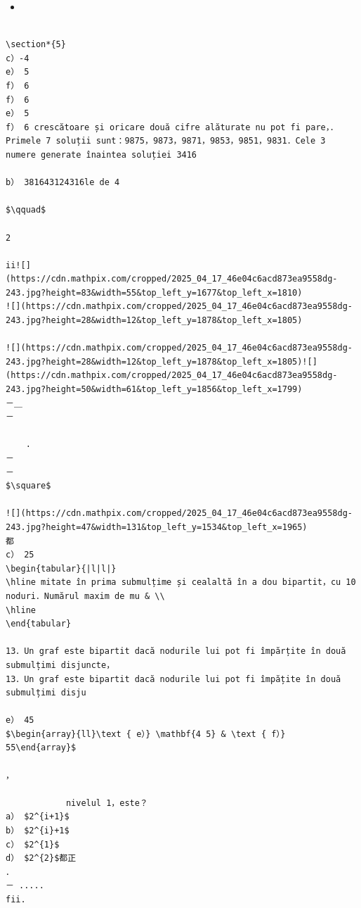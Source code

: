 \documentclass[10pt]{article}
\begin{document}
\begin{itemize}
  \item 
\end{itemize}

\begin{verbatim}

\section*{5}
c）-4
e） 5
f） 6
f） 6
e） 5
f） 6 crescătoare și oricare două cifre alăturate nu pot fi pare，．Primele 7 soluții sunt：9875，9873，9871，9853，9851，9831．Cele 3 numere generate înaintea soluției 3416

b） 381643124316le de 4
                    
$\qquad$
                                                                                                    2
                                                                                        ii![](https://cdn.mathpix.com/cropped/2025_04_17_46e04c6acd873ea9558dg-243.jpg?height=83&width=55&top_left_y=1677&top_left_x=1810)
![](https://cdn.mathpix.com/cropped/2025_04_17_46e04c6acd873ea9558dg-243.jpg?height=28&width=12&top_left_y=1878&top_left_x=1805)

![](https://cdn.mathpix.com/cropped/2025_04_17_46e04c6acd873ea9558dg-243.jpg?height=28&width=12&top_left_y=1878&top_left_x=1805)![](https://cdn.mathpix.com/cropped/2025_04_17_46e04c6acd873ea9558dg-243.jpg?height=50&width=61&top_left_y=1856&top_left_x=1799)
－＿
－

    .
－
－
$\square$

![](https://cdn.mathpix.com/cropped/2025_04_17_46e04c6acd873ea9558dg-243.jpg?height=47&width=131&top_left_y=1534&top_left_x=1965)
都
c） 25
\begin{tabular}{|l|l|}
\hline mitate în prima submulțime și cealaltă în a dou bipartit，cu 10 noduri．Numărul maxim de mu & \\
\hline
\end{tabular}

13．Un graf este bipartit dacă nodurile lui pot fi împărțite în două submulțimi disjuncte，
13．Un graf este bipartit dacă nodurile lui pot fi împățite în două submulțimi disju

e） 45
$\begin{array}{ll}\text { e）} \mathbf{4 5} & \text { f）} 55\end{array}$
 
，

            nivelul 1，este？
a） $2^{i+1}$
b） $2^{i}+1$
c） $2^{1}$
d） $2^{2}$都正
．
－ ..... 
fii.


\end{verbatim}
\end{document}
